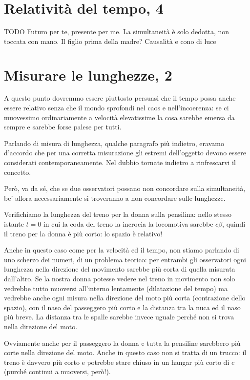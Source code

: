 \section{Relatività del tempo, 4}

TODO Futuro per te, presente per me.
La simultaneità è solo dedotta, non toccata con mano.
Il figlio prima della madre? Causalità e cono di luce


\section{Misurare le lunghezze, 2}

A questo punto dovremmo essere piuttosto persuasi che il tempo possa anche essere relativo senza che il mondo sprofondi nel caos e nell'incoerenza: se ci muovessimo ordinariamente a velocità elevatissime la cosa sarebbe emersa da sempre e sarebbe forse palese per tutti.

Parlando di misura di lunghezza, qualche paragrafo più indietro, eravamo d'accordo che per una corretta misurazione gli estremi dell'oggetto devono essere considerati contemporaneamente. Nel dubbio tornate indietro a rinfrescarvi il concetto.

Però, va da sé, che se due osservatori possano non concordare sulla simultaneità, be' allora necessariamente si troveranno a non concordare sulle lunghezze.

Verifichiamo la lunghezza del treno per la donna sulla pensilina: nello stesso istante $t=0$ in cui la coda del treno la incrocia la locomotiva sarebbe $c \beta$, quindi il treno per la donna è più corto: lo spazio è relativo!

Anche in questo caso come per la velocità ed il tempo, non stiamo parlando di uno scherzo dei numeri, di un problema teorico: per entrambi gli osservatori ogni lunghezza nella direzione del movimento sarebbe più corta di quella misurata dall'altro. Se la nostra donna potesse vedere nel treno in movimento non solo vedrebbe tutto muoversi all'interno lentamente (dilatazione del tempo) ma vedrebbe anche ogni misura nella direzione del moto più corta (contrazione dello spazio), con il naso del passeggero più corto e la distanza tra la nuca ed il naso più breve. La distanza tra le spalle sarebbe invece uguale perché non si trova nella direzione del moto.

Ovviamente anche per il passeggero la donna e tutta la pensiline sarebbero più corte nella direzione del moto. Anche in questo caso non si tratta di un trucco: il treno è davvero più corto e potrebbe stare chiuso in un hangar più corto di $c$ (purché continui a muoversi, però!). 

